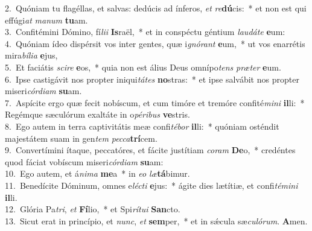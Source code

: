 {2.~}Quóniam tu flagéllas, et salvas: dedúcis ad ínferos, \textit{et} \textit{re}\textbf{dú}cis:~* et non est qui effúgi\textit{at} \textit{ma}\textit{num} \textbf{tu}am.\\
{3.~}Confitémini Dómino, fí\textit{li}\textit{i} \textbf{Is}raël,~* et in conspéctu géntium \textit{lau}\textit{dá}\textit{te} \textbf{e}um:\\
{4.~}Quóniam ídeo dispérsit vos inter gentes, quæ i\textit{gnó}\textit{rant} \textbf{e}um,~* ut vos enarrétis mira\textit{bí}\textit{li}\textit{a} \textbf{e}jus,\\
{5.~}Et faciátis \textit{sci}\textit{re} \textbf{e}os,~* quia non est álius Deus omnípo\textit{tens} \textit{præ}\textit{ter} \textbf{e}um.\\
{6.~}Ipse castigávit nos propter iniqui\textit{tá}\textit{tes} \textbf{no}stras:~* et ipse salvábit nos propter miseri\textit{cór}\textit{di}\textit{am} \textbf{su}am.\\
{7.~}Aspícite ergo quæ fecit nobíscum, et cum timóre et tremóre confité\textit{mi}\textit{ni} \textbf{il}li:~* Regémque sæculórum exaltáte in o\textit{pé}\textit{ri}\textit{bus} \textbf{ve}stris.\\
{8.~}Ego autem in terra captivitátis meæ confi\textit{té}\textit{bor} \textbf{il}li:~* quóniam osténdit majestátem suam in gen\textit{tem} \textit{pec}\textit{ca}\textbf{trí}cem.\\
{9.~}Convertímini ítaque, peccatóres, et fácite justítiam \textit{co}\textit{ram} \textbf{De}o,~* credéntes quod fáciat vobíscum miseri\textit{cór}\textit{di}\textit{am} \textbf{su}am:\\
{10.~}Ego autem, et á\textit{ni}\textit{ma} \textbf{me}a~* in \textit{e}\textit{o} \textit{læ}\textbf{tá}bimur.\\
{11.~}Benedícite Dóminum, omnes e\textit{lé}\textit{cti} \textbf{e}jus:~* ágite dies lætítiæ, et confi\textit{té}\textit{mi}\textit{ni} \textbf{il}li.\\
{12.~}Glória Pa\textit{tri}, \textit{et} \textbf{Fí}lio,~* et Spi\textit{rí}\textit{tu}\textit{i} \textbf{San}cto.\\
{13.~}Sicut erat in princípio, et \textit{nunc}, \textit{et} \textbf{sem}per,~* et in sǽcula sæ\textit{cu}\textit{ló}\textit{rum}. \textbf{A}men.\\
